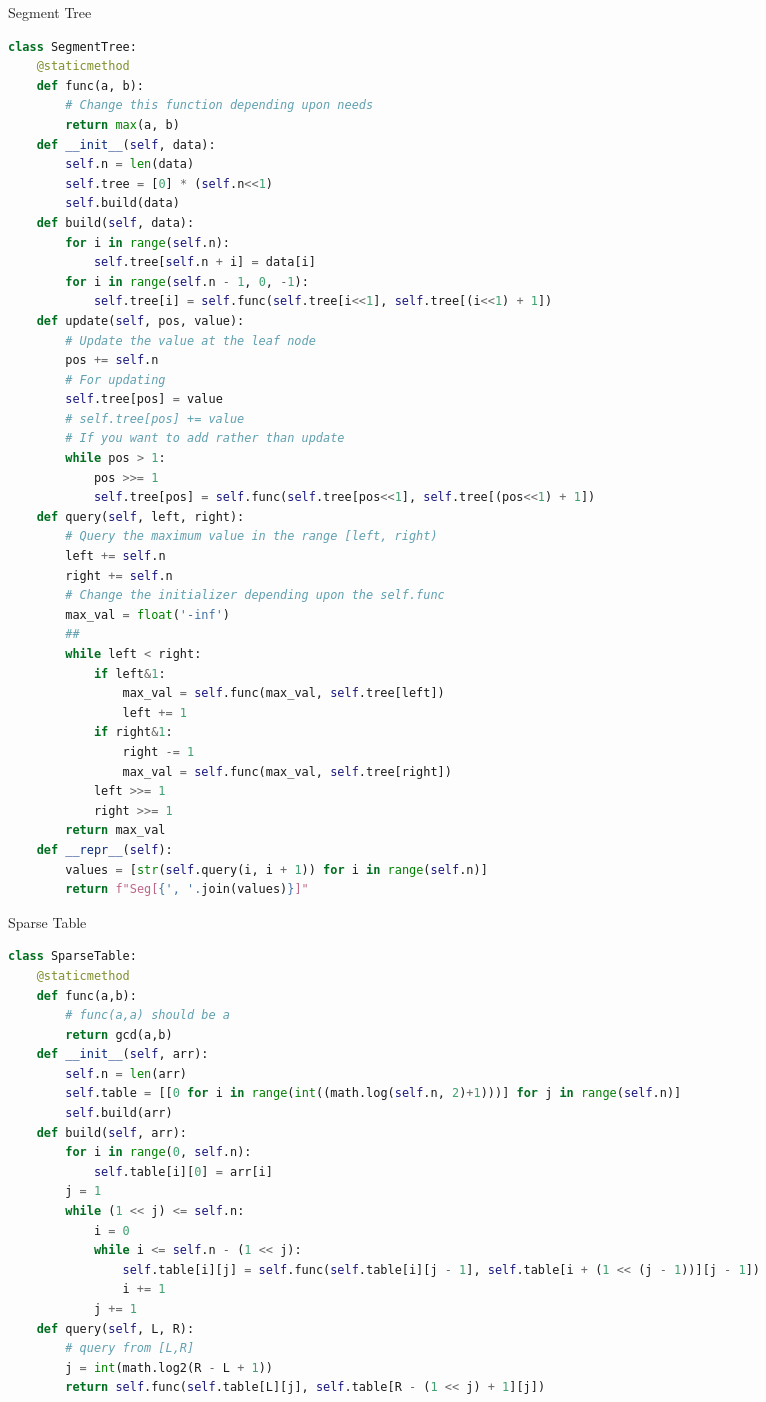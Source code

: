 \documentclass[10pt,landscape, a4paper]{article}
\begin{document}
\begin{multicols*}{3}
Segment Tree
\begin{lstlisting}[language=Python]
class SegmentTree:
    @staticmethod
    def func(a, b):
        # Change this function depending upon needs
        return max(a, b)
    def __init__(self, data):
        self.n = len(data)
        self.tree = [0] * (self.n<<1)
        self.build(data)
    def build(self, data):
        for i in range(self.n):
            self.tree[self.n + i] = data[i]
        for i in range(self.n - 1, 0, -1):
            self.tree[i] = self.func(self.tree[i<<1], self.tree[(i<<1) + 1])
    def update(self, pos, value):
        # Update the value at the leaf node
        pos += self.n
        # For updating
        self.tree[pos] = value
        # self.tree[pos] += value
        # If you want to add rather than update
        while pos > 1:
            pos >>= 1
            self.tree[pos] = self.func(self.tree[pos<<1], self.tree[(pos<<1) + 1])
    def query(self, left, right):
        # Query the maximum value in the range [left, right)
        left += self.n
        right += self.n
        # Change the initializer depending upon the self.func
        max_val = float('-inf')
        ##
        while left < right:
            if left&1:
                max_val = self.func(max_val, self.tree[left])
                left += 1
            if right&1:
                right -= 1
                max_val = self.func(max_val, self.tree[right])
            left >>= 1
            right >>= 1
        return max_val
    def __repr__(self):
        values = [str(self.query(i, i + 1)) for i in range(self.n)]
        return f"Seg[{', '.join(values)}]"
\end{lstlisting}

Sparse Table
\begin{lstlisting}[language=Python]
class SparseTable:
    @staticmethod
    def func(a,b):
        # func(a,a) should be a
        return gcd(a,b)
    def __init__(self, arr):
        self.n = len(arr)
        self.table = [[0 for i in range(int((math.log(self.n, 2)+1)))] for j in range(self.n)]
        self.build(arr)
    def build(self, arr):
        for i in range(0, self.n):
            self.table[i][0] = arr[i]
        j = 1
        while (1 << j) <= self.n:
            i = 0
            while i <= self.n - (1 << j):
                self.table[i][j] = self.func(self.table[i][j - 1], self.table[i + (1 << (j - 1))][j - 1])
                i += 1
            j += 1
    def query(self, L, R):
        # query from [L,R]
        j = int(math.log2(R - L + 1))
        return self.func(self.table[L][j], self.table[R - (1 << j) + 1][j])
\end{lstlisting}


\end{multicols*}
\end{document}
